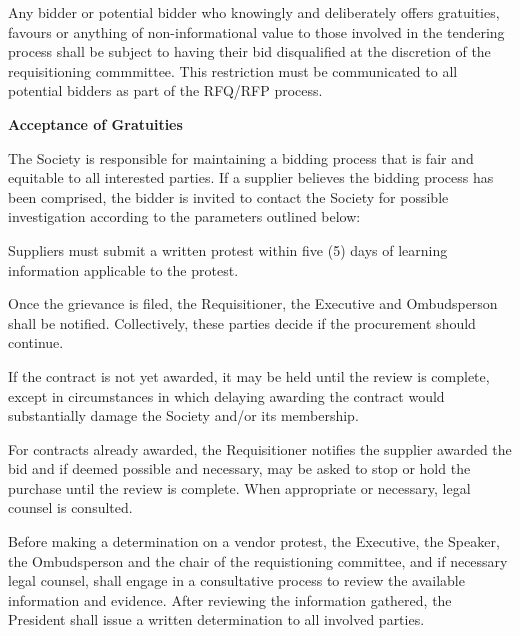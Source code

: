 \begin{longenum}[label*=\thesection.\arabic*., align=left]
\begin{longenum} [label*=\arabic*., align=left]
		\item Any bidder or potential bidder who knowingly and deliberately offers gratuities, favours or anything of non-informational value to those involved in the tendering process shall be subject to having their bid disqualified at the discretion of the requisitioning commmittee. This restriction must be communicated to all potential bidders as part of the RFQ/RFP process.
\end{longenum}

\item \textbf{Acceptance of Gratuities}

\begin{longenum} [label*=\arabic*., align=left]
		\item The Society is responsible for maintaining a bidding process that is fair and equitable to all interested parties. If a supplier believes the bidding process has been comprised, the bidder is invited to contact the Society for possible investigation according to the parameters outlined below:
		
		\item Suppliers must submit a written protest within five (5) days of learning information applicable to the protest.
		
		\item Once the grievance is filed, the Requisitioner, the Executive and Ombudsperson shall be notified. Collectively, these parties decide if the procurement should continue. 
		
		\item If the contract is not yet awarded, it may be held until the review is complete, except in circumstances in which delaying awarding the contract would substantially damage the Society and/or its membership. 
		
		\item For contracts already awarded, the Requisitioner notifies the supplier awarded the bid and if deemed possible and necessary, may be asked to stop or hold the purchase until the review is complete. When appropriate or necessary, legal counsel is consulted.
		
		\item Before making a determination on a vendor protest, the Executive, the Speaker, the Ombudsperson and the chair of the requistioning committee, and if necessary legal counsel, shall engage in a consultative process to review the available information and evidence. After reviewing the information gathered, the President shall issue a written determination to all involved parties.
\end{longenum}


\end{longenum}
